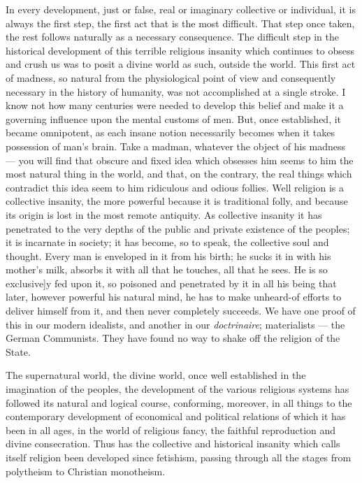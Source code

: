 \documentclass[12pt]{report}
\begin{document}
In every development, just or false, real or imaginary collective or individual, it is always the first step, the first act that is the most difficult. That step once taken, the rest follows naturally as a necessary consequence. The difficult step in the historical development of this terrible religious insanity which continues to obsess and crush us was to posit a divine world as such, outside the world. This first act of madness, so natural from the physiological point of view and consequently necessary in the history of humanity, was not accomplished at a single stroke. I know not how many centuries were needed to develop this belief and make it a governing influence upon the mental customs of men. But, once established, it became omnipotent, as each insane notion necessarily becomes when it takes possession of man’s brain. Take a madman, whatever the object of his madness — you will find that obscure and fixed idea which obsesses him seems to him the most natural thing in the world, and that, on the contrary, the real things which contradict this idea seem to him ridiculous and odious follies. Well religion is a collective insanity, the more powerful because it is traditional folly, and because its origin is lost in the most remote antiquity. As collective insanity it has penetrated to the very depths of the public and private existence of the peoples; it is incarnate in society; it has become, so to speak, the collective soul and thought. Every man is enveloped in it from his birth; he sucks it in with his mother’s milk, absorbs it with all that he touches, all that he sees. He is so exclusive]y fed upon it, so poisoned and penetrated by it in all his being that later, however powerful his natural mind, he has to make unheard-of efforts to deliver himself from it, and then never completely succeeds. We have one proof of this in our modern idealists, and another in our \emph{doctrinaire}; materialists — the German Communists. They have found no way to shake off the religion of the State.


The supernatural world, the divine world, once well established in the imagination of the peoples, the development of the various religious systems has followed its natural and logical course, conforming, moreover, in all things to the contemporary development of economical and political relations of which it has been in all ages, in the world of religious fancy, the faithful reproduction and divine consecration. Thus has the collective and historical insanity which calls itself religion been developed since fetishism, passing through all the stages from polytheism to Christian monotheism.
\end{document}

